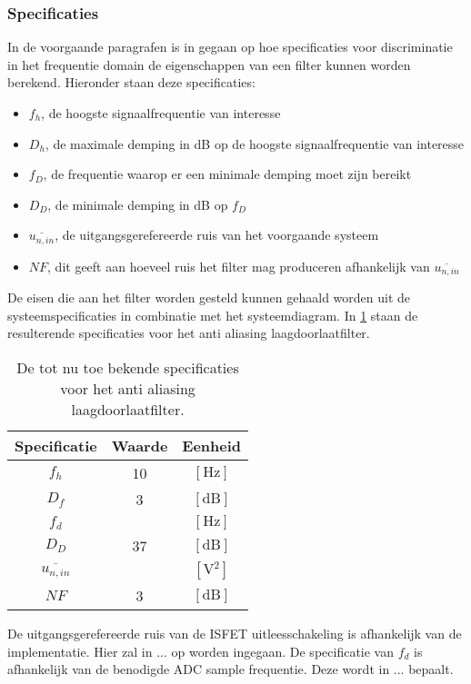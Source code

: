 \subsubsection{Specificaties}
In de voorgaande paragrafen is in gegaan op hoe specificaties voor discriminatie in het frequentie domain de eigenschappen van een filter kunnen worden berekend. Hieronder staan deze specificaties:
\begin{itemize}
    \item $f_h$, de hoogste signaalfrequentie van interesse
    \item $D_h$, de maximale demping in dB op de hoogste signaalfrequentie van interesse
    \item $f_D$, de frequentie waarop er een minimale demping moet zijn bereikt
    \item $D_D$, de minimale demping in dB op $f_D$
    \item $\overline{u_{n,in}}$, de uitgangsgerefereerde ruis van het voorgaande systeem
    \item $NF$, dit geeft aan hoeveel ruis het filter mag produceren afhankelijk van $\overline{u_{n,in}}$
\end{itemize}

De eisen die aan het filter worden gesteld kunnen gehaald worden uit de systeemspecificaties in combinatie met het systeemdiagram. In \cref{tab:prelimenarySpecsAAfilter} staan de resulterende specificaties voor het anti aliasing laagdoorlaatfilter.
\begin{table}[ht]
    \centering
    \begin{tabular}{c|c|c}
        Specificatie & Waarde & Eenheid \\\hline
        $f_h$ & 10 & $[\si{\hertz}]$\\
        $D_f$ & 3   & $[\mathrm{dB}]$ \\
        $f_d$ &  & $[\si{\hertz}]$ \\
        $D_D$ & 37   & $[\mathrm{dB}]$ \\
        $\overline{u_{n,in}}$ & & $[\si{\volt^2}]$\\
        $NF$ & 3 & $[\mathrm{dB}]$
    \end{tabular}
    \caption{De tot nu toe bekende specificaties voor het anti aliasing laagdoorlaatfilter.}
    \label{tab:prelimenarySpecsAAfilter}
\end{table}

De uitgangsgerefereerde ruis van de ISFET uitleesschakeling is afhankelijk van de implementatie. Hier zal in ... op worden ingegaan.
De specificatie van $f_d$ is afhankelijk van de benodigde ADC sample frequentie. Deze wordt in ... bepaalt.